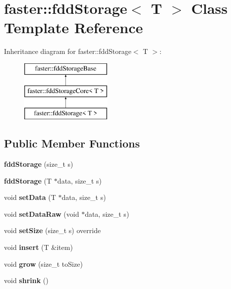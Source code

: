 \hypertarget{classfaster_1_1fddStorage}{}\section{faster\+:\+:fdd\+Storage$<$ T $>$ Class Template Reference}
\label{classfaster_1_1fddStorage}
Inheritance diagram for faster\+:\+:fdd\+Storage$<$ T $>$\+:\begin{figure}[H]
\begin{center}
\leavevmode
\includegraphics[height=3.000000cm]{classfaster_1_1fddStorage}
\end{center}
\end{figure}
\subsection*{Public Member Functions}
\begin{DoxyCompactItemize}
\item 
\hypertarget{classfaster_1_1fddStorage_a64a6657ec7779098209f214e9eb0dcbf}{}\label{classfaster_1_1fddStorage_a64a6657ec7779098209f214e9eb0dcbf} 
{\bfseries fdd\+Storage} (size\+\_\+t s)
\item 
\hypertarget{classfaster_1_1fddStorage_ac559d1855128c84e2afecad11e6c544e}{}\label{classfaster_1_1fddStorage_ac559d1855128c84e2afecad11e6c544e} 
{\bfseries fdd\+Storage} (T $\ast$data, size\+\_\+t s)
\item 
\hypertarget{classfaster_1_1fddStorage_ab766932e5707c5e89811848024e4d8ca}{}\label{classfaster_1_1fddStorage_ab766932e5707c5e89811848024e4d8ca} 
void {\bfseries set\+Data} (T $\ast$data, size\+\_\+t s)
\item 
\hypertarget{classfaster_1_1fddStorage_aae86c7f166895c3bcb4da4dfd0029856}{}\label{classfaster_1_1fddStorage_aae86c7f166895c3bcb4da4dfd0029856} 
void {\bfseries set\+Data\+Raw} (void $\ast$data, size\+\_\+t s)
\item 
\hypertarget{classfaster_1_1fddStorage_a11e678410ee62756860b55073d89ee2f}{}\label{classfaster_1_1fddStorage_a11e678410ee62756860b55073d89ee2f} 
void {\bfseries set\+Size} (size\+\_\+t s) override
\item 
\hypertarget{classfaster_1_1fddStorage_aae02a1cfeb1845ab9f7e347fbafcb791}{}\label{classfaster_1_1fddStorage_aae02a1cfeb1845ab9f7e347fbafcb791} 
void {\bfseries insert} (T \&item)
\item 
\hypertarget{classfaster_1_1fddStorage_aa0e4fd7ae90d85ff2f1b4654c2bf0960}{}\label{classfaster_1_1fddStorage_aa0e4fd7ae90d85ff2f1b4654c2bf0960} 
void {\bfseries grow} (size\+\_\+t to\+Size)
\item 
\hypertarget{classfaster_1_1fddStorage_a919925ed678dad9b556d9cdc4974d4a9}{}\label{classfaster_1_1fddStorage_a919925ed678dad9b556d9cdc4974d4a9} 
void {\bfseries shrink} ()
\end{DoxyCompactItemize}
